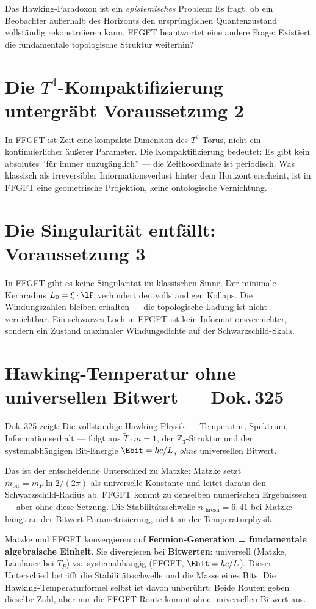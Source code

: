 Das Hawking-Paradoxon ist ein \emph{epistemisches} Problem: Es fragt, ob ein
Beobachter außerhalb des Horizonts den ursprünglichen Quantenzustand
vollständig rekonstruieren kann. FFGFT beantwortet eine andere Frage:
Existiert die fundamentale topologische Struktur weiterhin?

\section{Die $T^4$-Kompaktifizierung untergräbt Voraussetzung 2}

In FFGFT ist Zeit eine kompakte Dimension des $T^4$-Torus, nicht ein
kontinuierlicher äußerer Parameter. Die Kompaktifizierung bedeutet: Es gibt
kein absolutes \enquote{für immer unzugänglich} --- die Zeitkoordinate ist
periodisch. Was klassisch als irreversibler Informationsverlust hinter dem
Horizont erscheint, ist in FFGFT eine geometrische Projektion, keine
ontologische Vernichtung.

\section{Die Singularität entfällt: Voraussetzung 3}

In FFGFT gibt es keine Singularität im klassischen Sinne. Der minimale
Kernradius $L_0 = \xi \cdot \lP$ verhindert den vollständigen Kollaps. Die
Windungszahlen bleiben erhalten --- die topologische Ladung ist nicht vernichtbar.
Ein schwarzes Loch in FFGFT ist kein Informationsvernichter, sondern ein
Zustand maximaler Windungsdichte auf der Schwarzschild-Skala.

\section{Hawking-Temperatur ohne universellen Bitwert --- Dok.\,325}

Dok.\,325 zeigt: Die vollständige Hawking-Physik --- Temperatur,
Spektrum, Informationserhalt --- folgt aus $\tilde{T} \cdot m = 1$,
der $\mathbb{Z}_3$-Struktur und der systemabhängigen Bit-Energie
$\Ebit = \hbar c / L$, \emph{ohne} universellen Bitwert.

Das ist der entscheidende Unterschied zu Matzke: Matzke setzt
$m_{\text{bit}} = m_P \ln 2 / (2\pi)$ als universelle Konstante und
leitet daraus den Schwarzschild-Radius ab. FFGFT kommt zu denselben
numerischen Ergebnissen --- aber ohne diese Setzung. Die Stabilitäts\-schwelle
$n_{\text{thresh}} = 6{,}41$ bei Matzke hängt an der Bitwert-Para\-me\-tri\-sie\-rung,
nicht an der Temperaturphysik.

\begin{keyresult}
Matzke und FFGFT konvergieren auf \textbf{Fermion-Generation = fundamentale
algebraische Einheit}. Sie divergieren bei \textbf{Bitwerten}: universell
(Matzke, Landauer bei $T_P$) vs.\ systemabhängig (FFGFT, $\Ebit = \hbar c/L$).
Dieser Unterschied betrifft die Stabilitätsschwelle und die Masse eines Bits.
Die Hawking-Temperaturformel selbst ist davon unberührt: Beide Routen geben
dieselbe Zahl, aber nur die FFGFT-Route kommt ohne universellen Bitwert aus.
\end{keyresult}
